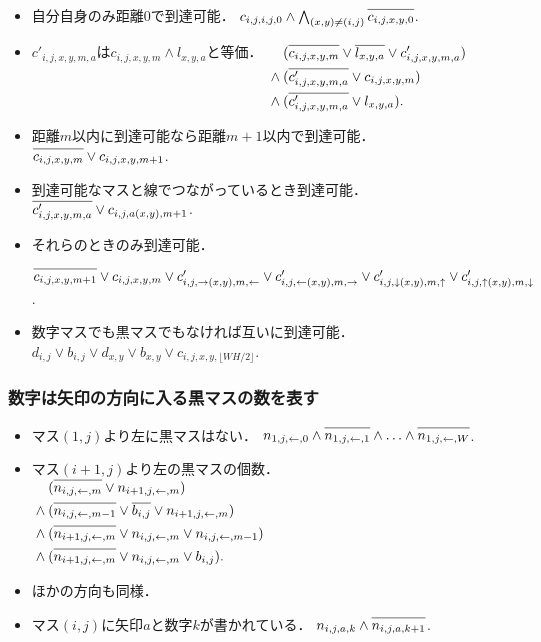 \documentclass[a4j]{jarticle}
\newcommand{\N}[1]{\overline{#1\vphantom{l}}}
\newcommand{\←}{{\leftarrow}}
\newcommand{\→}{{\rightarrow}}
\newcommand{\↑}{{\uparrow}}
\newcommand{\↓}{{\downarrow}}
\begin{document}
\begin{itemize}
\item 自分自身のみ距離0で到達可能．
  $c_{i,j,i,j,0}\land \bigwedge_{(x,y)\ne(i,j)} \N{c_{i,j,x,y,0}}$.

\item $c'_{i,j,x,y,m,a}$は$c_{i,j,x,y,m}\land l_{x,y,a}$と等価．
  \quad
  $\begin{aligned}[t]
   &(\N{c_{i,j,x,y,m}}\lor\N{l_{x,y,a}}\lor{c'_{i,j,x,y,m,a}})\\{}\land{}
   &(\N{c'_{i,j,x,y,m,a}}\lor{c_{i,j,x,y,m}})\\{}\land{}
   &(\N{c'_{i,j,x,y,m,a}}\lor{l_{x,y,a}}).
   \end{aligned}$

\item 距離$m$以内に到達可能なら距離$m+1$以内で到達可能．
   $\N{c_{i,j,x,y,m}}\lor c_{i,j,x,y,m+1}$.
\item 到達可能なマスと線でつながっているとき到達可能．
   $\N{c'_{i,j,x,y,m,a}}\lor{c_{i,j,a(x,y),m+1}}$.
\item それらのときのみ到達可能．
   \par\qquad
     $\N{c_{i,j,x,y,m+1}}\lor
      c_{i,j,x,y,m}\lor
      c'_{i,j,\→(x,y),m,\←}\lor
      c'_{i,j,\←(x,y),m,\→}\lor
      c'_{i,j,\↓(x,y),m,\↑}\lor
      c'_{i,j,\↑(x,y),m,\↓}$.

\item 数字マスでも黒マスでもなければ互いに到達可能．
  $d_{i,j}\lor b_{i,j}\lor
   d_{x,y}\lor b_{x,y}\lor
   c_{i,j,x,y,\lfloor WH/2\rfloor}$.
\end{itemize}

\subsubsection{数字は矢印の方向に入る黒マスの数を表す}

\begin{itemize}
\item マス$(1,j)$より左に黒マスはない．
$n_{1,j,\←,0}
\land \N{n_{1,j,\←,1}} \land\ldots\land \N{n_{1,j,\←,W}}$.

\item マス$(i+1,j)$より左の黒マスの個数．
  $\begin{aligned}[t]
   &(\N{n_{i,j,\←,m}}\lor n_{i+1,j,\←,m})\\{}\land{}
   &(\N{n_{i,j,\←,m-1}}\lor\N{b_{i,j}}\lor n_{i+1,j,\←,m})\\{}\land{}
   &(\N{n_{i+1,j,\←,m}}\lor n_{i,j,\←,m}\lor n_{i,j,\←,m-1})\\
   {}\land{}
   &(\N{n_{i+1,j,\←,m}}\lor n_{i,j,\←,m}\lor b_{i,j}).
   \end{aligned}$

\item ほかの方向も同様．

\item マス$(i,j)$に矢印$a$と数字$k$が書かれている．
  $n_{i,j,a,k}\land\N{n_{i,j,a,k+1}}$.
\end{itemize}
\end{document}
